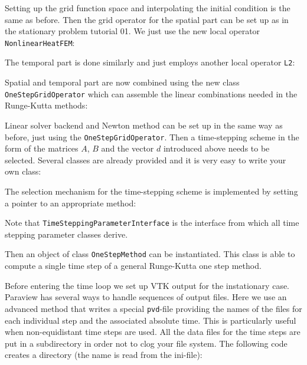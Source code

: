 \documentclass[a4paper,12pt]{article}
\begin{document}
Setting up the grid function space and interpolating the initial condition
is the same as before. Then the grid operator for the spatial part can be
set up as in the stationary problem tutorial 01. We just use the new
local operator \lstinline{NonlinearHeatFEM}:


The temporal part is done similarly and just employs another local operator
\lstinline{L2}:


Spatial and temporal part are now combined using the
new class \lstinline{OneStepGridOperator} which can assemble
the linear combinations needed in the Runge-Kutta methods:


Linear solver backend and Newton method can be set up 
in the same way as before, just using the \lstinline{OneStepGridOperator}.
Then a time-stepping scheme in the form of
the matrices $A$, $B$ and the vector $d$ introduced above needs to be selected.
Several classes are already provided and it is very easy to write your own class:


The selection mechanism for the time-stepping scheme
is implemented by setting a pointer to an appropriate method:

Note that \lstinline{TimeSteppingParameterInterface} is the interface from
which all time stepping parameter classes derive.

Then an object of class \lstinline{OneStepMethod} can be instantiated.
This class is able to compute a single time step of a general
Runge-Kutta one step method.


Before entering the time loop we set up VTK output for the instationary case.
Paraview has several ways to handle sequences of output files. Here we use
an advanced method that writes a special \lstinline{pvd}-file providing the
names of the files for each individual step and the associated absolute time. This
is particularly useful when non-equidistant time steps are used. All the
data files for the time steps are put in a subdirectory in order not to clog your file system.
The following code creates a directory (the name is read from the ini-file):

\end{document}
